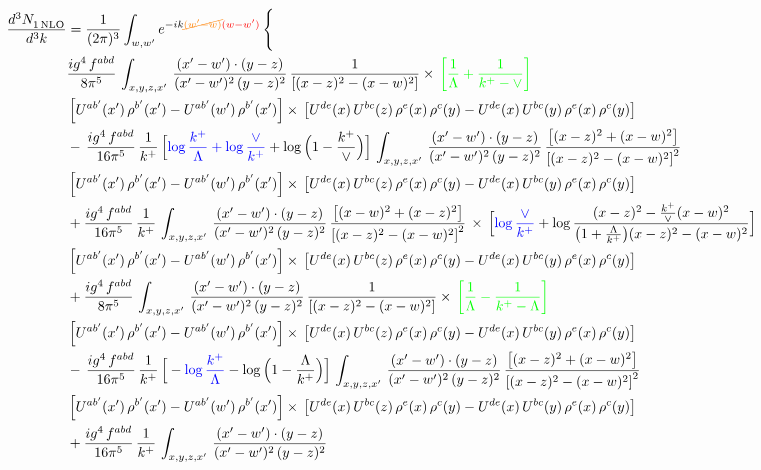 \documentclass[9pt]{article}
\numberwithin{equation}{section}
\begin{document}
\begin{align}
   \frac{d^{3}N_{1\,\rm NLO}^{\rm}}{d^{3}k}  & = \frac{1}{(2\pi)^{3}}  \int_{w, w^\prime} e^{-ik{\color{orange}\cancel{(w^\prime-w)}}{\color{red}(w-w^\prime)}}\, \Bigg\{\notag \\ & \frac{ig^{4}\,f^{abd}}{8\pi^{5}}\,\int_{x,y,z,x'}\, \frac{(x'-w')\cdot (y-z)}{(x'-w')^{2}\,(y-z)^{2}}\, \frac{1}{\left[(x-z)^{2}-(x-w)^{2}\right]}\times\, {\color{green}\left[\frac{1}{\Lambda}+\frac{1}{k^{+}-\vee}\right]}\notag \\ & \left[U^{ab'}(x')\,\rho^{b'}(x')-U^{ab'}(w')\, \rho^{b'}(x')\right]\times\, \left[U^{de}(x)\,U^{bc}(z)\, \rho^{e}(x)\,\rho^{c}(y)-U^{de}(x)\,U^{bc}(y)\,\rho^{e}(x)\,\rho^{c}(y)\right]\notag \\ & -\,\frac{ig^{4}\,f^{abd}}{16\pi^{5}}\,\frac{1}{k^{+}}\,\Big[{\color{blue}\log\frac{k^{+}}{\Lambda}+\log\frac{\vee}{k^{+}}}+\log\Big(1-\frac{k^{+}}{\vee}\Big)\Big]\,\int_{x,y,z,x'}\, \frac{(x'-w')\cdot (y-z)}{(x'-w')^{2}\,(y-z)^{2}}\,\frac{\left[(x-z)^{2}+(x-w)^{2}\right]}{\left[(x-z)^{2}-(x-w)^{2}\right]^{2}}\notag \\ & \left[U^{ab'}(x')\,\rho^{b'}(x')-U^{ab'}(w')\, \rho^{b'}(x')\right]\times\, \left[U^{de}(x)\,U^{bc}(z)\, \rho^{e}(x)\,\rho^{c}(y)-U^{de}(x)\,U^{bc}(y)\,\rho^{e}(x)\,\rho^{c}(y)\right]\notag \\ &  +\frac{ig^{4}\,f^{abd}}{16\pi^{5}}\, \frac{1}{k^{+}}\,\int_{x,y,z,x'}\, \frac{(x'-w')\cdot (y-z)}{(x'-w')^{2}\,(y-z)^{2}}\, \frac{\left[(x-w)^{2}+(x-z)^{2}\right]}{\left[(x-z)^{2}-(x-w)^{2}\right]^{2}}\, \times\, \Big[{\color{blue}\log\frac{\vee}{k^{+}}}+\log\frac{(x-z)^{2}-\frac{k^{+}}{\vee}(x-w)^{2}}{\big(1+\frac{\Lambda}{k^{+}}\big)(x-z)^{2}-(x-w)^{2}}\Big]\notag \\ & \left[U^{ab'}(x')\,\rho^{b'}(x')-U^{ab'}(w')\, \rho^{b'}(x')\right]\times\, \left[U^{de}(x)\,U^{bc}(z)\, \rho^{e}(x)\,\rho^{c}(y)-U^{de}(x)\,U^{bc}(y)\,\rho^{e}(x)\,\rho^{c}(y)\right]\notag \\ &  + \frac{ig^{4}\,f^{abd}}{8\pi^{5}}\,\int_{x,y,z,x'}\, \frac{(x'-w')\cdot (y-z)}{(x'-w')^{2}\,(y-z)^{2}}\, \frac{1}{\left[(x-z)^{2}-(x-w)^{2}\right]}\times\, {\color{green}\left[\frac{1}{\Lambda}-\frac{1}{k^{+}-\Lambda}\right]}\notag \\ & \left[U^{ab'}(x')\,\rho^{b'}(x')-U^{ab'}(w')\, \rho^{b'}(x')\right]\times\, \left[U^{de}(x)\,U^{bc}(z)\, \rho^{e}(x)\,\rho^{c}(y)-U^{de}(x)\,U^{bc}(y)\,\rho^{e}(x)\,\rho^{c}(y)\right]\notag \\ & -\,\frac{ig^{4}\,f^{abd}}{16\pi^{5}}\,\frac{1}{k^{+}}\,\Big[-{\color{blue}\log\frac{k^{+}}{\Lambda}}-\log\Big(1-\frac{\Lambda}{k^{+}}\Big)\Big]\,\int_{x,y,z,x'}\, \frac{(x'-w')\cdot (y-z)}{(x'-w')^{2}\,(y-z)^{2}}\,\frac{\left[(x-z)^{2}+(x-w)^{2}\right]}{\left[(x-z)^{2}-(x-w)^{2}\right]^{2}}\notag \\ & \left[U^{ab'}(x')\,\rho^{b'}(x')-U^{ab'}(w')\, \rho^{b'}(x')\right]\times\, \left[U^{de}(x)\,U^{bc}(z)\, \rho^{e}(x)\,\rho^{c}(y)-U^{de}(x)\,U^{bc}(y)\,\rho^{e}(x)\,\rho^{c}(y)\right]\notag \\ & +\frac{ig^{4}\,f^{abd}}{16\pi^{5}}\, \frac{1}{k^{+}}\,\int_{x,y,z,x'}\, \frac{(x'-w')\cdot (y-z)}{(x'-w')^{2}\,(y-z)^{2}}\, 
\end{align}
\end{document}

